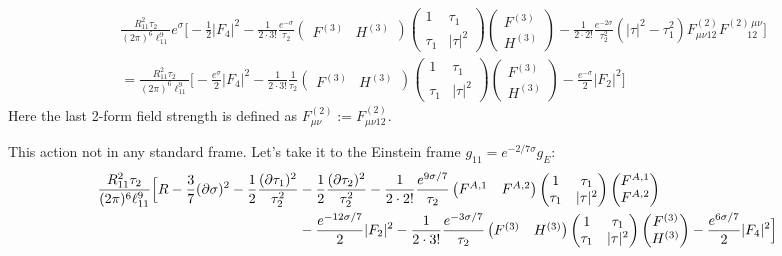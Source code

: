 \documentclass[11pt, class=article, crop=false]{standalone}
\begin{document}
\begin{enumerate}
\[\begin{aligned}
		&\frac{R_{11}^2 \tau_2}{(2 \pi)^6 \ell_{11}^9} e^{\sigma} \Big[-\frac{1}{2} |F_4|^2 
		 - \frac{1}{2 \cdot 3!}\frac{e^{-\sigma}}{\tau_2} \begin{pmatrix}
			F^{(3)} & H^{(3)}
		\end{pmatrix}\begin{pmatrix}
			1 & \tau_1\\ \tau_1 & |\tau|^2
		\end{pmatrix}\begin{pmatrix}
			F^{(3)}\\ H^{(3)}
		\end{pmatrix}
		 - \frac{1}{2 \cdot 2!} \frac{e^{-2\sigma}}{\tau_2^2} (|\tau|^2 - \tau_1^2) F_{\mu \nu 12}^{(2)} F_{\qquad12}^{(2)\, \mu \nu} ]\\
		 &= \frac{R_{11}^2 \tau_2}{(2 \pi)^6 \ell_{11}^9} \Big[-\frac{e^{\sigma}}{2} |F_4|^2 
		 - \frac{1}{2 \cdot 3!}\frac{1}{\tau_2} \begin{pmatrix}
			F^{(3)} & H^{(3)}
		\end{pmatrix}\begin{pmatrix}
			1 & \tau_1\\ \tau_1 & |\tau|^2
		\end{pmatrix}\begin{pmatrix}
			F^{(3)}\\ H^{(3)}
		\end{pmatrix}
		 - \frac{e^{-\sigma}}{2} |F_2|^2 \Big]
	\end{aligned}
	\]
	Here the last 2-form field strength is defined as $F^{(2)}_{\mu \nu} := F^{(2)}_{\mu \nu 12}$.
	
	This action not in any standard frame. Let's take it to the Einstein frame $g_{11} = e^{-2/7 \sigma} g_{E}$: 
	\[
	\begin{aligned}
		 \frac{R_{11}^2 \tau_2}{(2 \pi)^6 \ell_{11}^9} \Big[R - \frac37 (\partial\sigma)^2 - \frac12 \frac{(\partial \tau_1)^2}{\tau_2^2} &- \frac12 \frac{(\partial\tau_2)^2}{\tau_2^2} - \frac{1}{2\cdot 2!} \frac{e^{9\sigma/7}}{\tau_2} \begin{pmatrix}
			F^{A,1} & F^{A,2}
		\end{pmatrix}\begin{pmatrix}
			1 & \tau_1\\ \tau_1 & |\tau|^2
		\end{pmatrix}\begin{pmatrix}
			F^{A,1}\\ F^{A,2}
		\end{pmatrix} \\
		& - \frac{e^{-12\sigma/7}}{2} |F_2|^2
		 - \frac{1}{2 \cdot 3!}\frac{e^{-3\sigma/7}}{\tau_2} \begin{pmatrix}
			F^{(3)} & H^{(3)}
		\end{pmatrix}\begin{pmatrix}
			1 & \tau_1\\ \tau_1 & |\tau|^2
		\end{pmatrix}\begin{pmatrix}
			F^{(3)}\\ H^{(3)}
		\end{pmatrix}
		  -\frac{e^{6\sigma/7}}{2} |F_4|^2  \Big]
	\end{aligned}
	\]
	

\end{enumerate}
\end{document}
